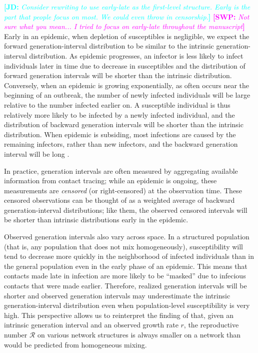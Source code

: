 \documentclass[12pt]{article}
\newcommand{\RR}{\ensuremath{{\mathcal R}}}
\newcommand{\comment}[3]{\textcolor{#1}{\textbf{[#2: }\textsl{#3}\textbf{]}}}
\newcommand{\jd}[1]{\comment{cyan}{JD}{#1}}
\newcommand{\swp}[1]{\comment{magenta}{SWP}{#1}}
\begin{document}
\jd{Consider rewriting to use early-late as the first-level structure. Early is the part that people focus on most. We could even throw in censorship.}
\swp{Not sure what you mean... I tried to focus on early-late throughout the manuscript}
Early in an epidemic, when depletion of susceptibles is negligible, we expect the forward generation-interval distribution to be similar to the intrinsic generation-interval distribution.
As epidemic progresses, an infector is less likely to infect individuals later in time due to decrease in susceptibles and the distribution of forward generation intervals will be shorter than the intrinsic distribution.
Conversely, when an epidemic is growing exponentially, as often occurs near the beginning of an outbreak, the number of newly infected individuals will be large relative to the number infected earlier on. 
A susceptible individual is thus relatively more likely to be infected by a newly infected individual, and the distribution of backward generation intervals will be shorter than the intrinsic distribution.
When epidemic is subsiding, most infections are caused by the remaining infectors, rather than new infectors, and the backward generation interval will be long \citep{champredon2015intrinsic}.

In practice, generation intervals are often measured by aggregating available information from contact tracing; while an epidemic is ongoing, these measurements are \emph{censored} (or right-censored) at the observation time.
These censored observations can be thought of as a weighted average of backward generation-interval distributions; like them, the observed censored intervals will be shorter than intrinsic distributions early in the epidemic.

Observed generation intervals also vary across space.
In a structured population (that is, any population that does not mix homogeneously), susceptibility will tend to decrease more quickly in the neighborhood of infected individuals than in the general population even in the early phase of an epidemic. 
This means that contacts made late in infection are more likely to be ``masked'' due to infecious contacts that were made earlier.
Therefore, realized generation intervals will be shorter and observed generation intervals may underestimate the intrinsic generation-interval distribution even when population-level susceptibility is very high.
This perspective allows us to reinterpret the finding of \cite{trapman2016inferring} that, given an intrinsic generation interval and an observed growth rate $r$, the reproductive number $\RR$ on various network structures is always smaller on a network than would be predicted from homogeneous mixing.
\end{document}
